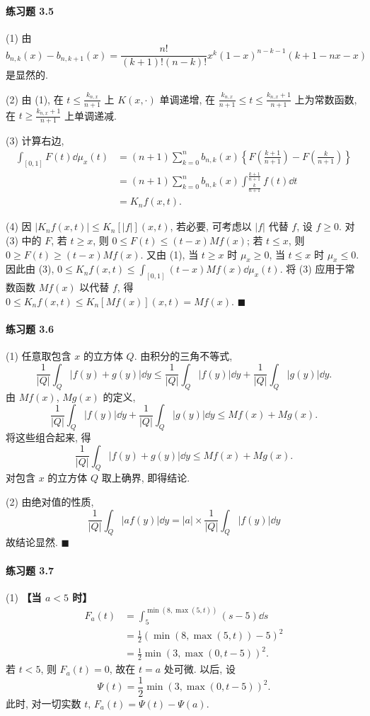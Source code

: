 \paragraph*{练习题 3.5}
(1) 由
\[
b_{n,k}(x) - b_{n,k+1}(x) = \frac{n!}{(k+1)!(n-k)!}x^{k}(1-x)^{n-k-1}(k+1-nx-x)
\]
是显然的.

(2) 由 (1), 在 $t \leq \frac{k_{n,x}}{n+1}$ 上 $K(x,\cdot)$ 单调递增, 在 $\frac{k_{n,x}}{n+1} \leq t \leq \frac{k_{n,x}+1}{n+1}$ 上为常数函数, 在 $t \geq \frac{k_{n,x}+1}{n+1}$ 上单调递减.

(3) 计算右边,
\begin{align*}
\int_{[0,1]}F(t)\dd\mu_{x}(t) &= (n+1)\sum_{k=0}^{n}b_{n,k}(x)\left\{F\left(\frac{k+1}{n+1}\right) - F\left(\frac{k}{n+1}\right)\right\} \\
&= (n+1)\sum_{k=0}^{n}b_{n,k}(x)\int_{\frac{k}{n+1}}^{\frac{k+1}{n+1}}f(t)\dd t \\
&= K_{n}f(x, t).
\end{align*}

(4) 因 $|K_{n}f(x,t)| \leq K_{n}[|f|](x,t)$, 若必要, 可考虑以 $|f|$ 代替 $f$, 设 $f \geq 0$. 对 (3) 中的 $F$, 若 $t \geq x$, 则 $0 \leq F(t) \leq (t-x)Mf(x)$; 若 $t \leq x$, 则 $0 \geq F(t) \geq (t-x)Mf(x)$. 又由 (1), 当 $t \geq x$ 时 $\mu_{x} \geq 0$, 当 $t \leq x$ 时 $\mu_{x} \leq 0$. 因此由 (3), $0 \leq K_{n}f(x,t) \leq \int_{[0,1]}(t-x)Mf(x)\dd\mu_{x}(t)$. 将 (3) 应用于常数函数 $Mf(x)$ 以代替 $f$, 得 $0 \leq K_{n}f(x,t) \leq K_{n}[Mf(x)](x,t) = Mf(x)$. $\blacksquare$

\paragraph*{练习题 3.6}
(1) 任意取包含 $x$ 的立方体 $Q$. 由积分的三角不等式,
\[
\frac{1}{|Q|}\int_{Q}|f(y)+g(y)|\dd y \leq \frac{1}{|Q|}\int_{Q}|f(y)|\dd y + \frac{1}{|Q|}\int_{Q}|g(y)|\dd y.
\]
由 $Mf(x)$, $Mg(x)$ 的定义,
\[
\frac{1}{|Q|}\int_{Q}|f(y)|\dd y + \frac{1}{|Q|}\int_{Q}|g(y)|\dd y \leq Mf(x) + Mg(x).
\]
将这些组合起来, 得
\[
\frac{1}{|Q|}\int_{Q}|f(y)+g(y)|\dd y \leq Mf(x) + Mg(x).
\]
对包含 $x$ 的立方体 $Q$ 取上确界, 即得结论.

(2) 由绝对值的性质,
\[
\frac{1}{|Q|}\int_{Q}|af(y)|\dd y = |a| \times \frac{1}{|Q|}\int_{Q}|f(y)|\dd y
\]
故结论显然. $\blacksquare$

\paragraph*{练习题 3.7}
(1) \textbf{【当 $a < 5$ 时】}
\begin{align*}
F_{a}(t) &= \int_{5}^{\min(8, \max(5, t))}(s-5)\dd s \\
&= \frac{1}{2}(\min(8, \max(5, t))-5)^{2} \\
&= \frac{1}{2}\min(3, \max(0, t-5))^{2}.
\end{align*}
若 $t < 5$, 则 $F_{a}(t) = 0$, 故在 $t = a$ 处可微. 以后, 设
\[
\Psi(t) = \frac{1}{2}\min(3, \max(0, t-5))^{2}.
\]
此时, 对一切实数 $t$, $F_{a}(t) = \Psi(t) - \Psi(a)$.

